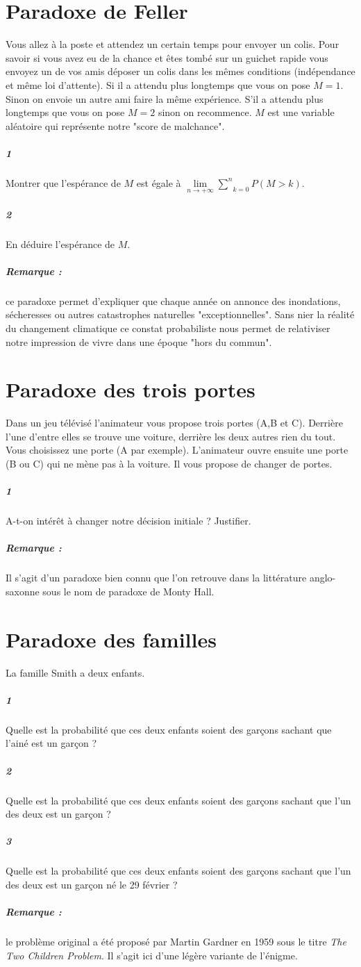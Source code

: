 \documentclass[10pt,a4paper]{article}
\begin{document}
\section{Paradoxe de Feller}
Vous allez à la poste et attendez un certain temps pour envoyer un colis. Pour savoir si vous avez eu de la chance et êtes tombé sur un guichet rapide vous envoyez un de vos amis déposer un colis dans les mêmes conditions (indépendance et même loi d'attente). Si il a attendu plus longtemps que vous on pose $M=1$. Sinon on envoie un autre ami faire la même expérience. S'il a attendu plus longtemps que vous on pose $M=2$ sinon on recommence. $M$ est une variable aléatoire qui représente notre "score de malchance".
\subparagraph{1}Montrer que l'espérance de $M$ est égale à $\underset{n \rightarrow +\infty}{\lim} \underset{k=0}{\overset{n}{\sum}}P(M>k)$.
\subparagraph{2}En déduire l'espérance de $M$.
\subparagraph{Remarque :} ce paradoxe permet d'expliquer que chaque année on annonce des inondations, sécheresses ou autres catastrophes naturelles "exceptionnelles". Sans nier la réalité du changement climatique ce constat probabiliste nous permet de relativiser notre impression de vivre dans une époque "hors du commun".

\section{Paradoxe des trois portes}
Dans un jeu télévisé l'animateur vous propose trois portes (A,B et C). Derrière l'une d'entre elles se trouve une voiture, derrière les deux autres rien du tout. Vous choisissez une porte (A par exemple). L'animateur ouvre ensuite une porte (B ou C) qui ne mène pas à la voiture. Il vous propose de changer de portes.
\subparagraph{1}A-t-on intérêt à changer notre décision initiale ? Justifier.
\subparagraph{Remarque :} Il s'agit d'un paradoxe bien connu que l'on retrouve dans la littérature anglo-saxonne sous le nom de paradoxe de Monty Hall.

\section{Paradoxe des familles}
 La famille Smith a deux enfants.
\subparagraph{1}Quelle est la probabilité que ces deux enfants soient des garçons sachant que l'ainé est un garçon ?
\subparagraph{2}Quelle est la probabilité que ces deux enfants soient des garçons sachant que l'un des deux est un garçon ?
\subparagraph{3} Quelle est la probabilité que ces deux enfants soient des garçons sachant que l'un des deux est un garçon né le 29 février ?
\subparagraph{Remarque :} le problème original a été proposé par Martin Gardner en 1959 sous le titre \textit{The Two Children Problem}. Il s'agit ici d'une légère variante de l'énigme.
\end{document}
